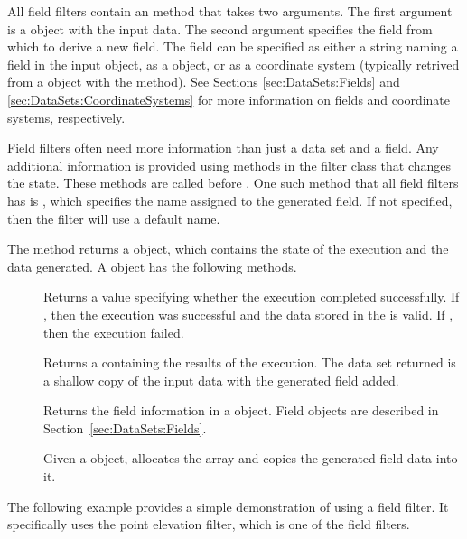 All field filters contain an  method that takes two
arguments. The first argument is a  object with the input
data. The second argument specifies the field from which to derive a new
field. The field can be specified as either a string naming a field in the
input  object, as a  object, or as
a coordinate system (typically retrived from a 
object with the  method). See Sections
\ref{sec:DataSets:Fields} and \ref{sec:DataSets:CoordinateSystems} for more
information on fields and coordinate systems, respectively.

Field filters often need more information than just a data set and a field.
Any additional information is provided using methods in the filter class
that changes the state. These methods are called before .
One such method that all field filters has is
, which specifies the name assigned to the
generated field. If not specified, then the filter will use a default name.

The  method returns a  object,
which contains the state of the execution and the data generated. A
 object has the following methods.

\begin{description}
\item[] Returns a  value specifying
  whether the execution completed successfully. If , then
  the execution was successful and the data stored in the
   is valid. If , then the
  execution failed.
\item[] Returns a  containing
  the results of the execution. The data set returned is a shallow copy of
  the input data with the generated field added.
\item[] Returns the field information in a
   object. Field objects are described in
  Section~\ref{sec:DataSets:Fields}.
\item[] Given a  object, allocates
  the array and copies the generated field data into it.
\end{description}

The following example provides a simple demonstration of using a field
filter. It specifically uses the point elevation filter, which is one of
the field filters.

